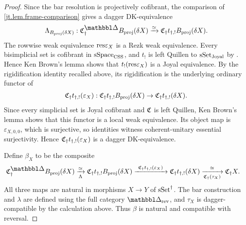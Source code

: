 \documentclass[a4paper,dvipdfmx,11pt]{amsart}
\begin{document}
\begin{proof}
  Since the bar resolution is projectively cofibrant, the comparison of \cref{jt.lem.frame-comparison} gives a dagger DK-equivalence
  \begin{align}
    \Lambda_{B_{\proj}(\delta X)}:
    \frakC^\prism_{\dag}B_{\proj}(\delta X)
    \xrightarrow{\simeq}
    \frakC_{\dag}t_{\dag,!}B_{\proj}(\delta X).
  \end{align}
  The rowwise weak equivalence $\mathrm{res}\varepsilon_X$ is a Rezk weak equivalence.
  Every bisimplicial set is cofibrant in $\mathrm{sSpace}_{\mathrm{CSS}}$, and $t_!$ is left Quillen to $\mathrm{sSet}_{\mathrm{Joyal}}$ by \cite[Theorems~4.1 and~4.12]{JT06}.
  Hence Ken Brown's lemma shows that $t_!(\mathrm{res}\varepsilon_X)$ is a Joyal equivalence.
  By the rigidification identity recalled above, its rigidification is the underlying ordinary functor of
  \begin{align}
    \mathfrak{C}_{\dag}t_{\dag,!}(\varepsilon_X):
    \mathfrak{C}_{\dag}t_{\dag,!}B_{\mathrm{proj}}(\delta X)
    \to
    \mathfrak{C}_{\dag}t_{\dag,!}(\delta X).
  \end{align}
  Since every simplicial set is Joyal cofibrant and $\mathfrak{C}$ is left Quillen, Ken Brown's lemma shows that this functor is a local weak equivalence.
  Its object map is $\varepsilon_{X,0,0}$, which is surjective, so identities witness coherent-unitary essential surjectivity.
  Hence $\mathfrak{C}_{\dag}t_{\dag,!}(\varepsilon_X)$ is a dagger DK-equivalence.

  Define $\beta_X$ to be the composite
  \begin{align}
    \frakC^{\prism}_{\dag}B_{\proj}(\delta X)
      &\xrightarrow[\Lambda]{\simeq}
    \frakC_{\dag}t_{\dag,!}B_{\proj}(\delta X)
      \xrightarrow{\ \frakC_{\dag}t_{\dag,!}(\varepsilon_X)\ }
    \frakC_{\dag}t_{\dag,!}(\delta X)
      \xrightarrow[\frakC_{\dag}(\tau_X)]{\cong}
    \frakC_{\dag}X.
  \end{align}
  All three maps are natural in morphisms $X\to Y$ of $\mathrm{sSet}^{\dag}$.
  The bar construction and $\lambda$ are defined using the full category $\prism_{\rev}$, and $\tau_X$ is dagger-compatible by the calculation above.
  Thus $\beta$ is natural and compatible with reversal.


\end{proof}
\end{document}

